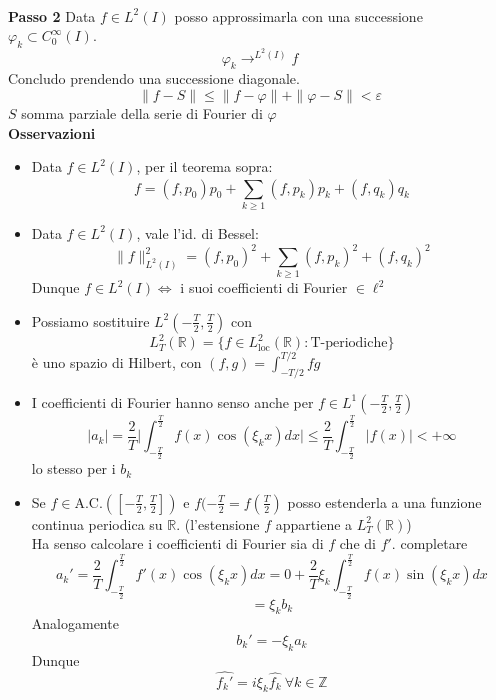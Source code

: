 \documentclass[a4paper]{article}
\newcommand{\R}{\mathbb{R}}
\newcommand{\Z}{\mathbb{Z}}
\begin{document}
\\\textbf{Passo 2} Data $f\in L^{2}(I)$ posso approssimarla con una successione $\varphi_k \subset C_0^\infty(I)$.
\[\varphi_k\rightarrow^{L^{2}(I)}f\]
Concludo prendendo una successione diagonale.
\[\|f-S\|\le \|f-\varphi\|+\|\varphi-S\|<\varepsilon\]
$S$ somma parziale della serie di Fourier di $\varphi$ 
\\\textbf{Osservazioni}
\begin{itemize}
	\item Data $f\in L^{2}(I)$, per il teorema sopra:
		\[f=(f,p_0)p_0+\sum_{k\ge 1}^{} (f,p_k)p_k+(f,q_k)q_k\]
	\item Data $f\in L^{2}(I)$, vale l'id. di Bessel:
		\[\|f\|_{L^{2}(I)}^2=(f,p_0)^2+\sum_{k\ge 1}^{} (f,p_k)^2+(f,q_k)^2\]
		Dunque $f\in L^{2}(I) \iff $ i suoi coefficienti di Fourier $\in \ell^2$ 
	\item Possiamo sostituire $L^{2}(-\frac{T}{2},\frac{T}{2})$ con 
		\[ L^{2}_T(\R)=\{f\in L_{\text{loc}}^2(\R):\text{T-periodiche}\} \]
		è uno spazio di Hilbert, con $(f,g)=\int_{-T / 2}^{T / 2} fg $ 
	\item I coefficienti di Fourier hanno senso anche per $f\in L^{1}(-\frac{T}{2},\frac{T}{2})$ 
		\[|a_k|=\frac{2}{T}\bigg|\int_{-\frac{T}{2}}^{\frac{T}{2}}f(x)\cos(\xi_kx)dx\bigg|\le \frac{2}{T } \int_{-\frac{T}{2}}^{\frac{T}{2}} |f(x)|<+\infty\]
		lo stesso per i $b_k$ 
	\item Se $f\in \text{A.C.}([-\frac{T}{2},\frac{T}{2}])$ e $f(-\frac{T}{2}=f(\frac{T}{2})$ posso estenderla a una funzione continua periodica su $\R$. (l'estensione $f$ appartiene a $L_T^2(\R)$)
		\\Ha senso calcolare i coefficienti di Fourier sia di $f$ che di $f'$.
		completare
\[a_k'=\frac{2}{T} \int_{-\frac{T}{2}}^{\frac{T}{2}} f'(x)\cos(\xi_kx)dx=0+\frac{2}{T}\xi_k \int_{-\frac{T}{2}}^{\frac{T}{2}} f(x)\sin(\xi_kx)dx\]
\[=\xi_kb_k\]
Analogamente
\[b_k'=-\xi_ka_k\]
Dunque
\[\hat{f_k'}=i\xi_k \hat{f_k}\ \forall k\in \Z\]

\end{itemize}
\end{document}
